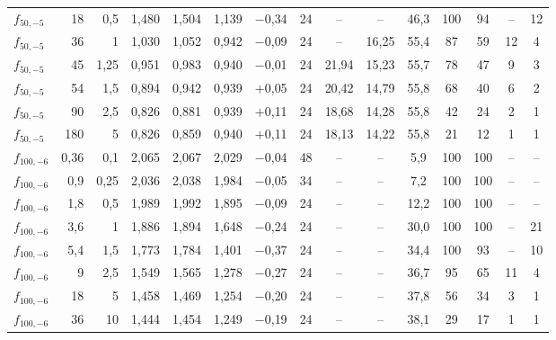 \begin{tabular}{lrr|cccc|c|cc|c|cc|cc}
$f_{50,-5}$ & 18 & 0{,}5 & 1{,}480 & 1{,}504 & 1{,}139 & $-$0{,}34 & 24 & -- & -- & 46{,}3 & 100 & 94 & -- & 12\\
$f_{50,-5}$ & 36 & 1 & 1{,}030 & 1{,}052 & 0{,}942 & $-$0{,}09 & 24 & -- & 16{,}25 & 55{,}4 & 87 & 59 & 12 & 4\\
$f_{50,-5}$ & 45 & 1{,}25 & 0{,}951 & 0{,}983 & 0{,}940 & $-$0{,}01 & 24 & 21{,}94 & 15{,}23 & 55{,}7 & 78 & 47 & 9 & 3\\
$f_{50,-5}$ & 54 & 1{,}5 & 0{,}894 & 0{,}942 & 0{,}939 & $+$0{,}05 & 24 & 20{,}42 & 14{,}79 & 55{,}8 & 68 & 40 & 6 & 2\\
$f_{50,-5}$ & 90 & 2{,}5 & 0{,}826 & 0{,}881 & 0{,}939 & $+$0{,}11 & 24 & 18{,}68 & 14{,}28 & 55{,}8 & 42 & 24 & 2 & 1\\
$f_{50,-5}$ & 180 & 5 & 0{,}826 & 0{,}859 & 0{,}940 & $+$0{,}11 & 24 & 18{,}13 & 14{,}22 & 55{,}8 & 21 & 12 & 1 & 1\\
\midrule
$f_{100,-6}$ & 0{,}36 & 0{,}1 & 2{,}065 & 2{,}067 & 2{,}029 & $-$0{,}04 & 48 & -- & -- & 5{,}9 & 100 & 100 & -- & --\\
$f_{100,-6}$ & 0{,}9 & 0{,}25 & 2{,}036 & 2{,}038 & 1{,}984 & $-$0{,}05 & 34 & -- & -- & 7{,}2 & 100 & 100 & -- & --\\
$f_{100,-6}$ & 1{,}8 & 0{,}5 & 1{,}989 & 1{,}992 & 1{,}895 & $-$0{,}09 & 24 & -- & -- & 12{,}2 & 100 & 100 & -- & --\\
$f_{100,-6}$ & 3{,}6 & 1 & 1{,}886 & 1{,}894 & 1{,}648 & $-$0{,}24 & 24 & -- & -- & 30{,}0 & 100 & 100 & -- & 21\\
$f_{100,-6}$ & 5{,}4 & 1{,}5 & 1{,}773 & 1{,}784 & 1{,}401 & $-$0{,}37 & 24 & -- & -- & 34{,}4 & 100 & 93 & -- & 10\\
$f_{100,-6}$ & 9 & 2{,}5 & 1{,}549 & 1{,}565 & 1{,}278 & $-$0{,}27 & 24 & -- & -- & 36{,}7 & 95 & 65 & 11 & 4\\
$f_{100,-6}$ & 18 & 5 & 1{,}458 & 1{,}469 & 1{,}254 & $-$0{,}20 & 24 & -- & -- & 37{,}8 & 56 & 34 & 3 & 1\\
$f_{100,-6}$ & 36 & 10 & 1{,}444 & 1{,}454 & 1{,}249 & $-$0{,}19 & 24 & -- & -- & 38{,}1 & 29 & 17 & 1 & 1\\
\bottomrule
\end{tabular}
